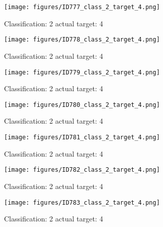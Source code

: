 \begin{figure}[h!]
\begin{center}
\texttt{[image: figures/ID777\_class\_2\_target\_4.png]}
\end{center}
\caption{ Classification: 2 actual target: 4}
\label{fig:ID777_class_2_target_4}
\end{figure}
\begin{figure}[h!]
\begin{center}
\texttt{[image: figures/ID778\_class\_2\_target\_4.png]}
\end{center}
\caption{ Classification: 2 actual target: 4}
\label{fig:ID778_class_2_target_4}
\end{figure}
\begin{figure}[h!]
\begin{center}
\texttt{[image: figures/ID779\_class\_2\_target\_4.png]}
\end{center}
\caption{ Classification: 2 actual target: 4}
\label{fig:ID779_class_2_target_4}
\end{figure}
\begin{figure}[h!]
\begin{center}
\texttt{[image: figures/ID780\_class\_2\_target\_4.png]}
\end{center}
\caption{ Classification: 2 actual target: 4}
\label{fig:ID780_class_2_target_4}
\end{figure}
\begin{figure}[h!]
\begin{center}
\texttt{[image: figures/ID781\_class\_2\_target\_4.png]}
\end{center}
\caption{ Classification: 2 actual target: 4}
\label{fig:ID781_class_2_target_4}
\end{figure}
\begin{figure}[h!]
\begin{center}
\texttt{[image: figures/ID782\_class\_2\_target\_4.png]}
\end{center}
\caption{ Classification: 2 actual target: 4}
\label{fig:ID782_class_2_target_4}
\end{figure}
\begin{figure}[h!]
\begin{center}
\texttt{[image: figures/ID783\_class\_2\_target\_4.png]}
\end{center}
\caption{ Classification: 2 actual target: 4}
\label{fig:ID783_class_2_target_4}
\end{figure}
